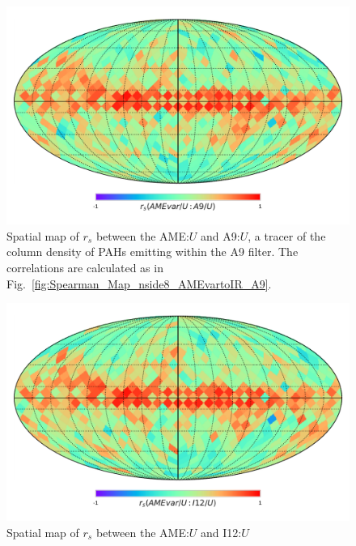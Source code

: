      \begin{figure}
       \includegraphics[width=\textwidth/2]{../Plots/Allsky_Corr/UNorm/Spearman_Map_nside8_AMEvartoA9.pdf}
       \centering
       \caption{Spatial map of $r_{s}$ between the AME:$U$ and A9:$U$, a tracer of the column density of PAHs emitting within the A9 filter. The correlations are calculated as in Fig.~\ref{fig:Spearman_Map_nside8_AMEvartoIR_A9}.}
       \label{fig:Spearman_Map_nside8_AMEvartoIR_UNorm_A9}
     \end{figure}
     \begin{figure}
       \includegraphics[width=\textwidth/2]{../Plots/Allsky_Corr/UNorm/Spearman_Map_nside8_AMEvartoI12.pdf}
       \centering
       \caption{Spatial map of $r_{s}$ between the AME:$U$ and I12:$U$}
       \label{fig:Spearman_Map_nside8_AMEvartoIR_UNorm_I12}
     \end{figure}
